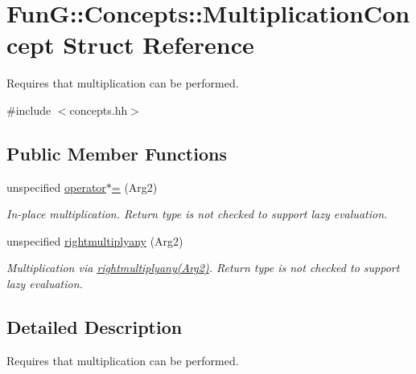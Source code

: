 \hypertarget{structFunG_1_1Concepts_1_1MultiplicationConcept}{\section{Fun\-G\-:\-:Concepts\-:\-:Multiplication\-Concept Struct Reference}
\label{structFunG_1_1Concepts_1_1MultiplicationConcept}
}


Requires that multiplication can be performed.  




{\ttfamily \#include $<$concepts.\-hh$>$}

\subsection*{Public Member Functions}
\begin{DoxyCompactItemize}
\item 
\hypertarget{structFunG_1_1Concepts_1_1MultiplicationConcept_ac91bb184ac3641bb86e8cc03497988f4}{unspecified \hyperlink{structFunG_1_1Concepts_1_1MultiplicationConcept_ac91bb184ac3641bb86e8cc03497988f4}{operator$\ast$=} (Arg2)}\label{structFunG_1_1Concepts_1_1MultiplicationConcept_ac91bb184ac3641bb86e8cc03497988f4}

\begin{DoxyCompactList}\small\item\em In-\/place multiplication. Return type is not checked to support lazy evaluation. \end{DoxyCompactList}\item 
\hypertarget{structFunG_1_1Concepts_1_1MultiplicationConcept_aaf1220bf588863cbfe3166f216b8422c}{unspecified \hyperlink{structFunG_1_1Concepts_1_1MultiplicationConcept_aaf1220bf588863cbfe3166f216b8422c}{rightmultiplyany} (Arg2)}\label{structFunG_1_1Concepts_1_1MultiplicationConcept_aaf1220bf588863cbfe3166f216b8422c}

\begin{DoxyCompactList}\small\item\em Multiplication via \hyperlink{structFunG_1_1Concepts_1_1MultiplicationConcept_aaf1220bf588863cbfe3166f216b8422c}{rightmultiplyany(\-Arg2)}. Return type is not checked to support lazy evaluation. \end{DoxyCompactList}\end{DoxyCompactItemize}


\subsection{Detailed Description}
Requires that multiplication can be performed. 

